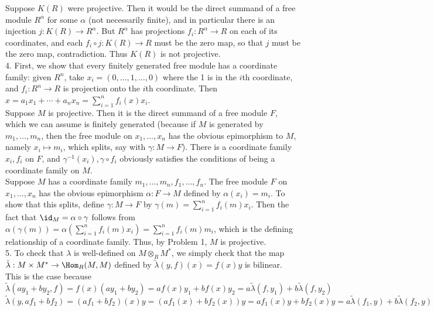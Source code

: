 \documentclass[11pt]{article}
\begin{document}
Suppose $K(R)$ were projective. Then it would be the direct summand of a
free module $R^\alpha$ for some $\alpha$ (not necessarily finite), and in
particular there is an injection $j:K(R)\rightarrow R^\alpha$. But $R^\alpha$
has projections $f_i:R^\alpha\rightarrow R$ on each of its coordinates,
and each $f_i\circ j:K(R)\rightarrow R$ must be the zero map, so that $j$
must be the zero map, contradiction. Thus $K(R)$ is not projective.    \\

\num{4.} First, we show that every finitely generated free module has a
coordinate family: given $R^n$, take $x_i=(0,\ldots,1,\ldots,0)$ where the
1 is in the $i$th coordinate, and $f_i:R^n\rightarrow R$ is projection onto
the $i$th coordinate. Then $x=a_1x_1+\cdots+a_nx_n=\sum_{i=1}^n f_i(x)x_i$.\\

Suppose $M$ is projective. Then it is the direct summand of a free module
$F$, which we can assume is finitely generated (because if $M$ is generated
by $m_1,\ldots,m_n$, then the free module on $x_1,\ldots,x_n$ has the
obvious epimorphism to $M$, namely $x_i\mapsto m_i$, which splits, say with
$\gamma:M\rightarrow F$). There is a coordinate family $x_i,f_i$ on $F$,
and $\gamma^{-1}(x_i),\gamma\circ f_i$ obviously satisfies the conditions
of being a coordinate family on $M$.      \\

Suppose $M$ has a coordinate family $m_1,\ldots,m_n,f_1,\ldots,f_n$. The
free module $F$ on $x_1,\ldots,x_n$ has the obvious epimorphism
$\alpha:F\rightarrow M$ defined by $\alpha(x_i)=m_i$. To show that
this splits, define $\gamma:M\rightarrow F$ by $\gamma(m)=\sum_{i=1}^n
f_i(m)x_i$. Then the fact that $\id_M=\alpha\circ\gamma$ follows from
$\alpha(\gamma(m))=\alpha(\sum_{i=1}^n f_i(m)x_i)=\sum_{i=1}^n f_i(m)m_i$,
which is the defining relationship of a coordinate family. Thus, by Problem 1,
$M$ is projective.\\

\num{5.} To check that $\lambda$ is well-defined on $M\otimes_R M^*$, we simply
check that the map $\tilde{\lambda}:M\times M^*\rightarrow\Hom_R(M,M)$ defined
by $\tilde{\lambda}(y,f)(x)=f(x)y$ is bilinear. This is the case because
\[\tilde{\lambda}(ay_1+by_2,f)=f(x)(ay_1+by_2)=af(x)y_1+bf(x)y_2=a\tilde{\lambda}(f,y_1)+b\tilde{\lambda}(f,y_2)\]
\[\tilde{\lambda}(y,af_1+bf_2)=(af_1+bf_2)(x)y=(af_1(x)+bf_2(x))y=af_1(x)y+bf_2(x)y=a\tilde{\lambda}(f_1,y)+b\tilde{\lambda}(f_2,y)\]
\end{document}
